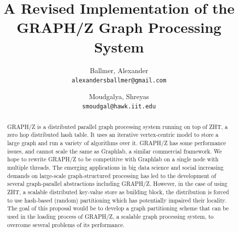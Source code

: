 \documentclass[10pt]{article}
\begin{document}
\nocite{Gz:5}
\title{A Revised Implementation of the GRAPH/Z Graph Processing System}

\author{
  Ballmer, Alexander\\
  \texttt{alexandersballmer@gmail.com}
  \and
  Moudgalya, Shreyas\\
  \texttt{smoudgal@hawk.iit.edu}
}

\maketitle

\begin{abstract}
  GRAPH/Z is a distributed parallel graph processing system running on top of ZHT, a zero hop distributed hash table. It uses an iterative vertex-centric model to store a large graph and run a variety of algorithms over it. GRAPH/Z has some performance issues, and cannot scale the same as Graphlab, a similar commercial framework. We hope to rewrite GRAPH/Z to be competitive with Graphlab on a single node with multiple threads. The emerging applications in big data science and social increasing demands on large-scale graph-structured processing has led to the development of several graph-parallel abstractions including GRAPH/Z. However, in the case of using ZHT, a scalable distributed key-value store as building block, the distribution is forced to use hash-based (random) partitioning which has potentially impaired their locality. The goal of this proposal would be to develop a graph partitioning scheme that can be used in the loading process of GRAPH/Z, a scalable graph processing system, to overcome several problems of its performance.
\end{abstract}
\end{document}
